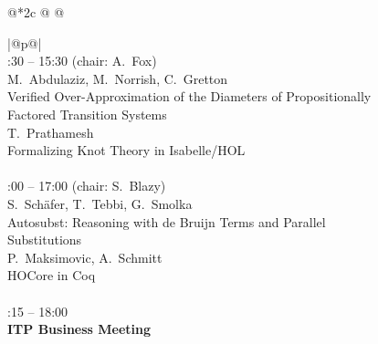 \documentclass[11pt]{report}
\begin{document}
\begin{figure}[p]
\begin{center}
{\begin{tabular}[t]{@{}*{2}{c @{\hspace{4mm}}} @{}}
\begin{tabular}[t]{|@{\hspace{0.5mm}}p{\cw}@{\hspace{0.5mm}}|}
  \hline
  \\
  :30 -- 15:30 (chair: A.~Fox)\smallskip\\
  M.~Abdulaziz, M.~Norrish, C.~Gretton\\
  Verified Over-Approximation of the Diameters of Propositionally Factored Transition 
  Systems\smallskip\\
  T.~Prathamesh\\
  Formalizing Knot Theory in Isabelle/HOL\\
  \hline
  \\
  :00 -- 17:00 (chair: S.~Blazy)\smallskip\\
  S.~Schäfer, T.~Tebbi, G.~Smolka\\ 
  Autosubst: Reasoning with de Bruijn Terms and Parallel 
  Substitutions\smallskip\\
  P.~Maksimovic, A.~Schmitt\\
  HOCore in Coq\\
  \hline
  \\
  :15 -- 18:00\smallskip\\
  \textbf{ITP Business Meeting}\\
  \hline
  \end{tabular}
\end{tabular}}
\end{center}
\end{figure}
\end{document}
